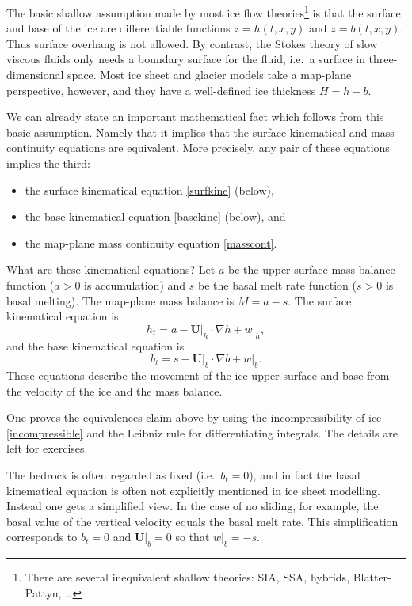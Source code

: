 \documentclass[titlepage,a4paper,final,12pt]{scrartcl}
\newcommand{\grad}{\nabla}
\begin{document}
The basic shallow assumption made by most ice flow theories\footnote{There are several inequivalent shallow theories: SIA, SSA, hybrids, Blatter-Pattyn, \dots} is that the surface and base of the ice are differentiable functions $z=h(t,x,y)$ and $z=b(t,x,y)$.  Thus surface overhang is not allowed.  By contrast, the Stokes theory of slow viscous fluids only needs a boundary surface for the fluid, i.e.~a surface in three-dimensional space.  Most ice sheet and glacier models take a map-plane perspective, however, and they have a well-defined ice thickness $H=h-b$.

We can already state an important mathematical fact which follows from this basic assumption.  Namely that it implies that the surface kinematical and mass continuity equations are equivalent.  More precisely, any pair of these equations implies the third:
  \begin{itemize}
  \item the surface kinematical equation \eqref{surfkine} (below),
  \item the base kinematical equation \eqref{basekine} (below), and
  \item the map-plane mass continuity equation \eqref{masscont}.
  \end{itemize}
What are these kinematical equations?  Let $a$ be the upper surface mass balance function ($a>0$ is accumulation) and $s$ be the basal melt rate function ($s>0$ is basal melting).  The map-plane mass balance is $M=a-s$.  The surface kinematical equation is 
\begin{equation}
h_t = a - \mathbf{U}\big|_h \cdot \grad h + w\big|_h,  \label{surfkine}
\end{equation}
and the base kinematical equation is
\begin{equation}
b_t = s - \mathbf{U}\big|_b \cdot \grad b + w\big|_b.  \label{basekine}
\end{equation}
These equations describe the movement of the ice upper surface and base from the velocity of the ice and the mass balance.

One proves the equivalences claim above by using the incompressibility of ice \eqref{incompressible} and the Leibniz rule for differentiating integrals.  The details are left for exercises.

The bedrock is often regarded as fixed (i.e.~$b_t=0$), and in fact the basal kinematical equation is often not explicitly mentioned in ice sheet modelling.  Instead one gets a simplified view.  In the case of no sliding, for example, the basal value of the vertical velocity equals the basal melt rate.  This simplification corresponds to $b_t=0$ and $\mathbf{U}\big|_b=0$ so that $w\big|_b=-s$.
\end{document}
